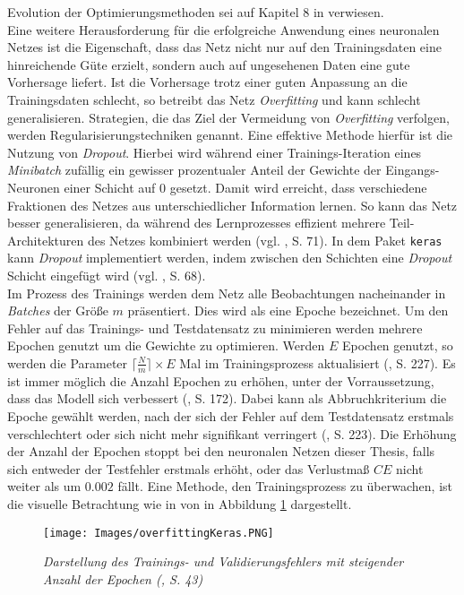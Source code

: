 \documentclass[a4paper,11pt]{article}
\begin{document}
Evolution der Optimierungsmethoden sei auf Kapitel 8 in \cite{deepL} verwiesen. \\

Eine weitere Herausforderung für die erfolgreiche Anwendung eines neuronalen Netzes ist die Eigenschaft, dass das Netz nicht nur auf den Trainingsdaten eine hinreichende Güte erzielt, sondern auch auf ungesehenen Daten eine gute Vorhersage liefert. Ist die Vorhersage trotz einer guten Anpassung an die Trainingsdaten schlecht, so betreibt das Netz \textit{Overfitting} und kann schlecht generalisieren. Strategien, die das Ziel der Vermeidung von \textit{Overfitting} verfolgen, werden Regularisierungstechniken genannt. Eine effektive Methode hierfür ist die Nutzung von \textit{Dropout}. Hierbei wird während einer Trainings-Iteration eines \textit{Minibatch} zufällig ein gewisser prozentualer Anteil der Gewichte der Eingangs-Neuronen einer Schicht auf $0$ gesetzt. Damit wird erreicht, dass verschiedene Fraktionen des Netzes aus unterschiedlicher Information lernen. So kann das Netz besser generalisieren, da während des Lernprozesses effizient mehrere Teil-Architekturen des Netzes kombiniert werden (vgl. \cite{deepEssentials}, S. 71). In dem Paket \texttt{keras} kann \textit{Dropout} implementiert werden, indem zwischen den Schichten eine \textit{Dropout} Schicht eingefügt wird (vgl. \cite{keras}, S. 68).\\
Im Prozess des Trainings werden dem Netz alle Beobachtungen nacheinander in \textit{Batches} der Größe $m$ präsentiert. Dies wird als eine Epoche bezeichnet. Um den Fehler auf das Trainings- und Testdatensatz zu minimieren werden mehrere Epochen genutzt um die Gewichte zu optimieren. Werden $E$ Epochen genutzt, so werden die Parameter $\lceil \frac{N}{m} \rceil \times E$ Mal im Trainingsprozess aktualisiert (\cite{deepNLP}, S. 227). Es ist immer möglich die Anzahl Epochen zu erhöhen, unter der Vorraussetzung, dass das Modell sich verbessert (\cite{deepNLP}, S. 172). Dabei kann als Abbruchkriterium die Epoche gewählt werden, nach der sich der Fehler auf dem Testdatensatz erstmals verschlechtert oder sich nicht mehr signifikant verringert (\cite{deepEssentials}, S. 223). Die Erhöhung der Anzahl der Epochen stoppt bei den neuronalen Netzen dieser Thesis, falls sich entweder der  Testfehler erstmals erhöht, oder das Verlustmaß $CE$ nicht weiter als um $0.002$ fällt. Eine Methode, den Trainingsprozess zu überwachen, ist die visuelle Betrachtung wie in von in Abbildung \ref{abb:overfitting} dargestellt.

\begin{figure}[!ht]
\begin{center}
\texttt{[image: Images/overfittingKeras.PNG]}
\caption{\textit{Darstellung des Trainings- und Validierungsfehlers mit steigender Anzahl der Epochen (\cite{keras}, S. 43)}}
\label{abb:overfitting}
\end{center}
\end{figure}
\end{document}
